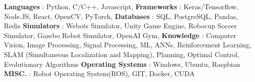 \begin{cventries}  
\skillentry
    {
    \space \textbf{Languages} : Python, C/C++, Javascript, 
    \space \textbf{Frameworks} : Keras/Tensorflow, Node.JS, React, OpenCV, PyTorch, 
    \space \textbf{Databases} : SQL, PostgreSQL, Pandas, Redis 
    \space \textbf{Simulators} : Webots Simulator, Unity Game Engine, Robocup Soccer Simulator, Gazebo Robot Simulator, OpenAI Gym,
    \space \textbf{Knowledge} : Computer Vision, Image Processing, Signal Processing, ML, ANNs, Reinforcement Learning, SLAM (Simultaneous Localization and Mapping), Planning, Optimal Control, Evolutionary Algorithms
    \space \textbf{Operating Systems} : Windows, Ubuntu, Raspbian 
    \space \textbf{MISC.} : Robot Operating System(ROS), GIT, Docker, CUDA
    }

\end{cventries}
